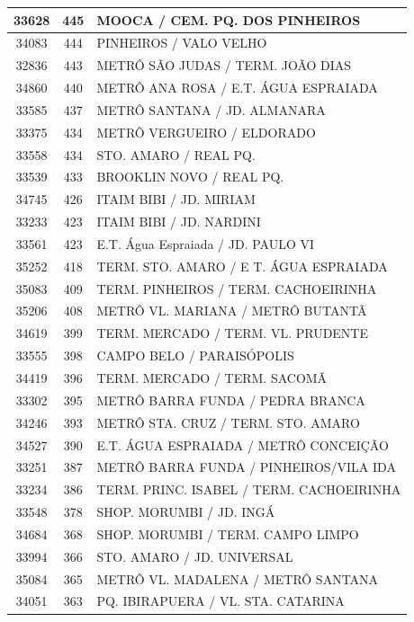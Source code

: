 \documentclass[
	12pt,				%
	oneside,			%
	a4paper,			%
	english,			%
	brazil				%
	]{abntex2ppgsi}
\begin{document}
{{{\begin{apendicesenv}
\begin{longtable}{c|c|p{7cm}}
 \hline 
33628 &	445 &	MOOCA / CEM. PQ. DOS PINHEIROS \\ 
 \hline 
34083 &	444 &	PINHEIROS / VALO VELHO \\ 
 \hline 
32836 &	443 &	METRÔ SÃO JUDAS / TERM. JOÃO DIAS \\ 
 \hline 
34860 &	440 &	METRÔ ANA ROSA / E.T. ÁGUA ESPRAIADA \\ 
 \hline 
33585 &	437 &	METRÔ SANTANA / JD. ALMANARA \\ 
 \hline 
33375 &	434 &	METRÔ VERGUEIRO / ELDORADO \\ 
 \hline 
33558 &	434 &	STO. AMARO / REAL PQ. \\ 
 \hline 
33539 &	433 &	BROOKLIN NOVO / REAL PQ. \\ 
 \hline 
34745 &	426 &	ITAIM BIBI / JD. MIRIAM \\ 
 \hline 
33233 &	423 &	ITAIM BIBI / JD. NARDINI \\ 
 \hline 
33561 &	423 &	E.T. Água Espraiada / JD. PAULO VI \\ 
 \hline 
35252 &	418 &	TERM. STO. AMARO / E T. ÁGUA ESPRAIADA \\ 
 \hline 
35083 &	409 &	TERM. PINHEIROS / TERM. CACHOEIRINHA \\ 
 \hline 
35206 &	408 &	METRÔ VL. MARIANA / METRÔ BUTANTÃ \\ 
 \hline 
34619 &	399 &	TERM. MERCADO / TERM. VL. PRUDENTE \\ 
 \hline 
33555 &	398 &	CAMPO BELO / PARAISÓPOLIS \\ 
 \hline 
34419 &	396 &	TERM. MERCADO / TERM. SACOMÃ \\ 
 \hline 
33302 &	395 &	METRÔ BARRA FUNDA / PEDRA BRANCA \\ 
 \hline 
34246 &	393 &	METRÔ STA. CRUZ / TERM. STO. AMARO \\ 
 \hline 
34527 &	390 &	E.T. ÁGUA ESPRAIADA / METRÔ CONCEIÇÃO \\ 
 \hline 
33251 &	387 &	METRÔ BARRA FUNDA / PINHEIROS/VILA IDA \\ 
 \hline 
33234 &	386 &	TERM. PRINC. ISABEL / TERM. CACHOEIRINHA \\ 
 \hline 
33548 &	378 &	SHOP. MORUMBI / JD. INGÁ \\ 
 \hline 
34684 &	368 &	SHOP. MORUMBI / TERM. CAMPO LIMPO \\ 
 \hline 
33994 &	366 &	STO. AMARO / JD. UNIVERSAL \\ 
 \hline 
35084 &	365 &	METRÔ VL. MADALENA / METRÔ SANTANA \\ 
 \hline 
34051 &	363 &	PQ. IBIRAPUERA / VL. STA. CATARINA \\ 

\end{longtable}
\end{apendicesenv}}}}
\end{document}
